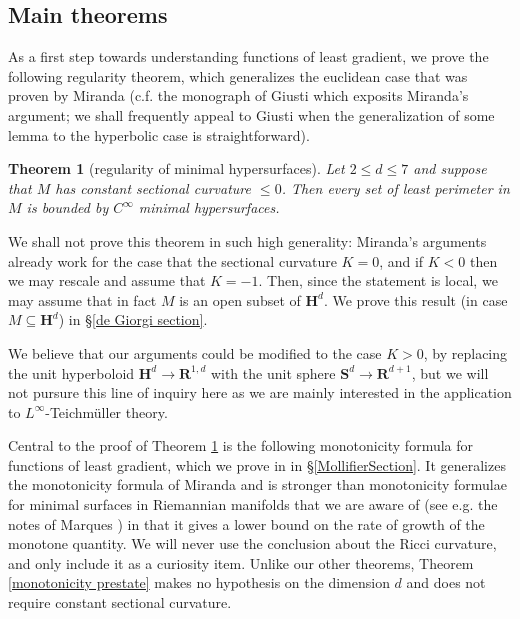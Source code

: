 \documentclass[reqno,12pt,letterpaper]{amsart}
\newcommand{\RR}{\mathbf{R}}
\newcommand{\Hyp}{\mathbf H}
\newcommand{\Sph}{\mathbf S}
\newtheorem{theorem}{Theorem}[section]
\theoremstyle{definition}
\numberwithin{equation}{section}
\begin{document}

\subsection{Main theorems}
As a first step towards understanding functions of least gradient, we prove the following regularity theorem, which generalizes the euclidean case that was proven by Miranda \cite{Miranda64, Miranda66, Miranda67} (c.f. the monograph of Giusti \cite{Giusti77} which exposits Miranda's argument; we shall frequently appeal to Giusti when the generalization of some lemma to the hyperbolic case is straightforward).

\begin{theorem}[regularity of minimal hypersurfaces]\label{main lma}
Let $2 \leq d \leq 7$ and suppose that $M$ has constant sectional curvature $\leq 0$.
Then every set of least perimeter in $M$ is bounded by $C^\infty$ minimal hypersurfaces.
\end{theorem}

We shall not prove this theorem in such high generality: Miranda's arguments already work for the case that the sectional curvature $K = 0$, and if $K < 0$ then we may rescale and assume that $K = -1$.
Then, since the statement is local, we may assume that in fact $M$ is an open subset of $\Hyp^d$.
We prove this result (in case $M \subseteq \Hyp^d$) in \S\ref{de Giorgi section}.

We believe that our arguments could be modified to the case $K > 0$, by replacing the unit hyperboloid $\Hyp^d \to \RR^{1, d}$ with the unit sphere $\Sph^d \to \RR^{d + 1}$, but we will not pursure this line of inquiry here as we are mainly interested in the application to $L^\infty$-Teichm\"uller theory.

Central to the proof of Theorem \ref{main lma} is the following monotonicity formula for functions of least gradient, which we prove in in \S\ref{MollifierSection}. It generalizes the monotonicity formula of Miranda \cite[Theorem 2.8]{Miranda66} and is stronger than monotonicity formulae for minimal surfaces in Riemannian manifolds that we are aware of (see e.g. the notes of Marques \cite[\S7]{MarquesXX}) in that it gives a lower bound on the rate of growth of the monotone quantity. We will never use the conclusion about the Ricci curvature, and only include it as a curiosity item.
Unlike our other theorems, Theorem \ref{monotonicity prestate} makes no hypothesis on the dimension $d$ and does not require constant sectional curvature.
\end{document}
